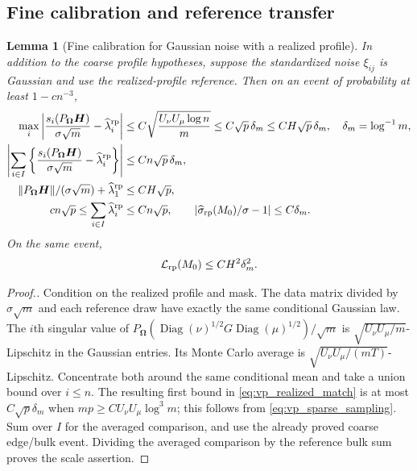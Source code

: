 \documentclass[numsec,webpdf,modern,large,namedate]{oup-authoring-template}
\theoremstyle{plain}
\newtheorem{slemma}{Lemma}%
\theoremstyle{remark}
\newcommand{\bH}{\bm{H}}
\newcommand{\bOmega}{\bm{\Omega}}
\newif\ifmarkchanges
\newenvironment{revision}{\begingroup\ifmarkchanges\color{red}\fi}{\endgroup}
\begin{document}
\begin{revision}
\subsection{Fine calibration and reference transfer}
\begin{slemma}[Fine calibration for Gaussian noise with a realized profile]
\label{lem:vp_sparse_reference}
In addition to the coarse profile hypotheses, suppose the standardized
noise $\xi_{ij}$ is Gaussian and use the realized-profile reference.
Then on an event of probability at least $1-cn^{-3}$,
\begin{align}
 \max_i\left|\frac{s_i(P_{\bOmega}\bH)}{\sigma\sqrt m}
                      -\widehat\lambda_i^{\rm rp}\right|
 &\le C\sqrt{\frac{U_\nu U_\mu\log n}{m}}
 \le C\sqrt p\,\delta_m\le CH\sqrt p\,\delta_m,
 \quad\delta_m=\log^{-1}m,\label{eq:vp_realized_match}\\
 \left|\sum_{i\in I}\left\{
      \frac{s_i(P_{\bOmega}\bH)}{\sigma\sqrt m}
                      -\widehat\lambda_i^{\rm rp}\right\}\right|
 &\le Cn\sqrt p\,\delta_m,\label{eq:vp_bulk_average_match}\\
 \|P_{\bOmega}\bH\|/(\sigma\sqrt m)+\widehat\lambda_1^{\rm rp}
 &\le CH\sqrt p,\label{eq:vp_edge_explicit}\\
 cn\sqrt p\le\sum_{i\in I}\widehat\lambda_i^{\rm rp}
 &\le Cn\sqrt p,\qquad
 |\widehat\sigma_{\rm rp}(M_0)/\sigma-1|\le C\delta_m.
 \label{eq:vp_bulk_explicit}
\end{align}
On the same event,
\begin{align}
 \mathcal L_{\rm rp}(M_0)\le CH^2\delta_m^2.
 \label{eq:vp_loss_true}
\end{align}
\end{slemma}
\begin{proof}[Proof.]
Condition on the realized profile and mask.  The data matrix divided by
$\sigma\sqrt m$ and each reference draw have exactly the same
conditional Gaussian law.  The $i$th singular value of
$P_{\bOmega}(\operatorname{Diag}(\nu)^{1/2}G
\operatorname{Diag}(\mu)^{1/2})/\sqrt m$ is
$\sqrt{U_\nu U_\mu/m}$-Lipschitz in the Gaussian entries.
Its Monte Carlo average is
$\sqrt{U_\nu U_\mu/(mT)}$-Lipschitz.  Concentrate both around the same
conditional mean and take a union bound over $i\le n$.
The resulting first bound in \eqref{eq:vp_realized_match} is at most
$C\sqrt p\delta_m$ when $mp\ge C U_\nu U_\mu\log^3 m$;
this follows from \eqref{eq:vp_sparse_sampling}.
Sum over $I$ for the averaged comparison, and use the already proved
coarse edge/bulk event.  Dividing the averaged comparison by the reference
bulk sum proves the scale assertion.  


\end{proof}
\end{revision}
\end{document}
